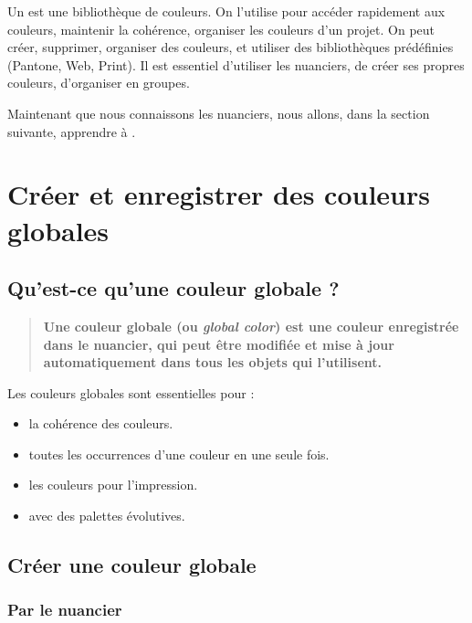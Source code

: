 Un  est une bibliothèque de couleurs. On l'utilise pour accéder rapidement aux couleurs, maintenir la cohérence, organiser les couleurs d'un projet. On peut créer, supprimer, organiser des couleurs, et utiliser des bibliothèques prédéfinies (Pantone, Web, Print). Il est essentiel d'utiliser les nuanciers, de créer ses propres couleurs, d'organiser en groupes.

Maintenant que nous connaissons les nuanciers, nous allons, dans la section suivante, apprendre à .

\section{Créer et enregistrer des couleurs globales}

\subsection{Qu'est-ce qu'une couleur globale ?}

\begin{quote}
\textbf{Une couleur globale (ou \emph{global color}) est une couleur enregistrée dans le nuancier, qui peut être modifiée et mise à jour automatiquement dans tous les objets qui l'utilisent.}
\end{quote}

Les couleurs globales sont essentielles pour :

\begin{itemize}
    \item {} la cohérence des couleurs.
    \item {} toutes les occurrences d'une couleur en une seule fois.
    \item {} les couleurs pour l'impression.
    \item {} avec des palettes évolutives.
\end{itemize}

\subsection{Créer une couleur globale}

\subsubsection{Par le nuancier}

